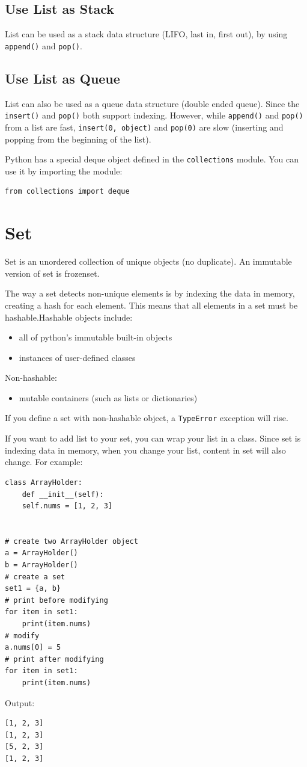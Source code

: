 \documentclass[12pt]{book}
\begin{document}
\subsection{Use List as Stack}
\label{sec:org01e15a7}
List can be used as a stack data structure (LIFO, last in, first out), by using \texttt{append()} and \texttt{pop()}.
\subsection{Use List as Queue}
\label{sec:org7064e83}
List can also be used as a queue data structure (double ended queue). Since the \texttt{insert()} and \texttt{pop()} both support indexing. However, while \texttt{append()} and \texttt{pop()} from a list are fast, \texttt{insert(0, object)} and \texttt{pop(0)} are slow (inserting and popping from the beginning of the list).

Python has a special deque object defined in the \texttt{collections} module. You can use it by importing the module:
\begin{verbatim}
from collections import deque
\end{verbatim}
\section{Set}
\label{sec:org09081df}
Set is an unordered collection of unique objects (no duplicate). An immutable version of set is frozenset.

The way a set detects non-unique elements is by indexing the data in memory, creating a hash for each element. This means that all elements in a set must be hashable.Hashable objects include:
\begin{itemize}
\item all of python's immutable built-in objects
\item instances of user-defined classes
\end{itemize}

Non-hashable:
\begin{itemize}
\item mutable containers (such as lists or dictionaries)
\end{itemize}

If you define a set with non-hashable object, a \texttt{TypeError} exception will rise.

If you want to add list to your set, you can wrap your list in a class. Since set is indexing data in memory, when you change your list, content in set will also change. For example:
\begin{verbatim}
class ArrayHolder:
    def __init__(self):
	self.nums = [1, 2, 3]


# create two ArrayHolder object
a = ArrayHolder()
b = ArrayHolder()
# create a set
set1 = {a, b}
# print before modifying 
for item in set1:
    print(item.nums)
# modify
a.nums[0] = 5
# print after modifying
for item in set1:
    print(item.nums)
\end{verbatim}
Output:
\begin{verbatim}
[1, 2, 3]
[1, 2, 3]
[5, 2, 3]
[1, 2, 3]
\end{verbatim}
\end{document}
